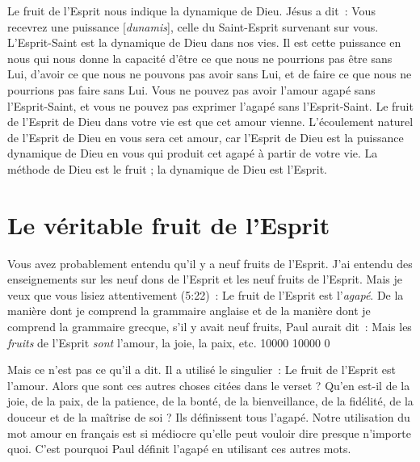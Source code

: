 \og Le fruit de l'Esprit \fg{} nous indique la dynamique de Dieu.
 Jésus a dit~: \og Vous recevrez une puissance [\emph{dunamis}],
 celle du Saint-Esprit survenant sur vous. \fg{}
 L'Esprit-Saint est la dynamique de Dieu dans nos vies.
 Il est cette puissance en nous qui nous donne la capacité
 d'être ce que nous ne pourrions pas être sans Lui,
 d'avoir ce que nous ne pouvons pas avoir sans Lui,
 et de faire ce que nous ne pourrions pas faire sans Lui.
 Vous ne pouvez pas avoir l'amour agapé sans l'Esprit-Saint,
 et vous ne pouvez pas exprimer l'agapé sans l'Esprit-Saint.
 Le fruit de l'Esprit de Dieu dans votre vie est que cet amour vienne.
 L'écoulement naturel de l'Esprit de Dieu en vous sera cet amour,
 car l'Esprit de Dieu est la puissance dynamique de Dieu
 en vous qui produit cet agapé à partir de votre vie.
 La méthode de Dieu est le fruit ; la dynamique de Dieu est l'Esprit.


\section*{Le véritable fruit de l'Esprit}

Vous avez probablement entendu qu'il y a neuf fruits de l'Esprit.
 J'ai entendu des enseignements sur les neuf dons de l'Esprit
 et les neuf fruits de l'Esprit. Mais je veux que vous lisiez
 attentivement (5:22)~:
 \og Le fruit de l'Esprit est l'\emph{agapé}. \fg{}
 De la manière dont je comprend la grammaire anglaise
 et de la manière dont je comprend la grammaire grecque,
 s'il y avait neuf fruits, Paul aurait dit~:
 \og Mais les \emph{fruits} de l'Esprit \emph{sont} l'amour,
 la joie, la paix, etc. \fg{}
 \begingroup{} 10000 10000 0
 \par\endgroup

Mais ce n'est pas ce qu'il a dit. Il a utilisé le singulier~:
 \og Le fruit de l'Esprit est l'amour. \fg{}
 Alors que sont ces autres choses citées dans le verset ?
 Qu'en est-il de la joie, de la paix, de la patience, de la bonté,
 de la bienveillance, de la fidélité, de la douceur
 et de la maîtrise de soi ? Ils définissent tous l'agapé.
 Notre utilisation du mot \og amour \fg{} en français est si médiocre
 qu'elle peut vouloir dire presque n'importe quoi.
 C'est pourquoi Paul définit l'agapé en utilisant ces autres mots.

